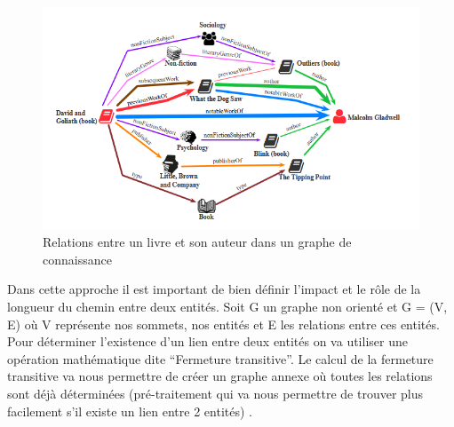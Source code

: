 \documentclass[12pt]{article}
\begin{document}
\begin{figure}[H]
\centering
\includegraphics[width=\textwidth, draft=false]{imgs/bookAuthorKG.PNG}
\caption{Relations entre un livre et son auteur dans un graphe de connaissance \cite{shiralkar2017finding}}
\label{fig1}
\end{figure}

Dans cette approche il est important de bien définir l'impact et le rôle de la longueur du chemin entre deux entités. 
Soit G un graphe non orienté et G = (V, E) où V représente nos sommets, nos entités et E les relations entre ces entités. Pour déterminer l'existence d'un lien entre deux entités on va utiliser une opération mathématique dite \enquote{Fermeture transitive}. Le calcul de la fermeture transitive va nous permettre de créer un graphe annexe où toutes les relations sont déjà déterminées (pré-traitement qui va nous permettre de trouver plus facilement s'il existe un lien entre 2 entités) \cite{JJLGraphes}.
\end{document}
